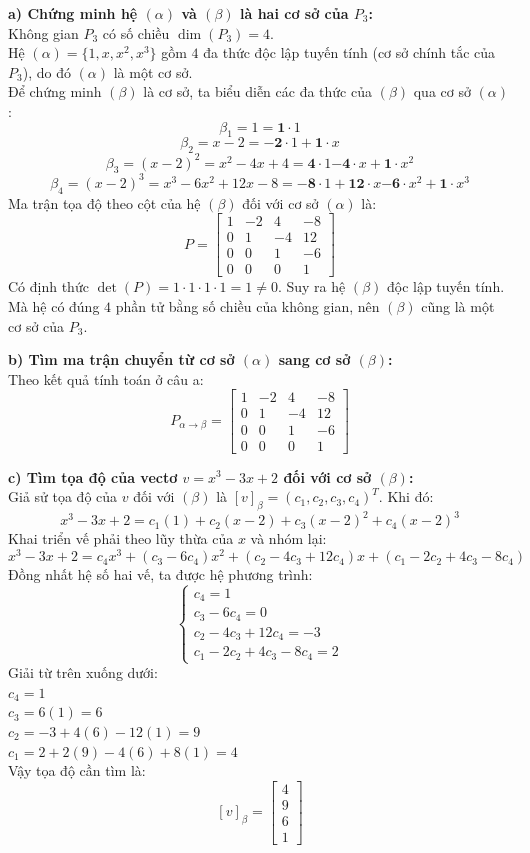 \documentclass[12pt,a4paper]{article}
\begin{document}
\textbf{a) Chứng minh hệ $(\alpha)$ và $(\beta)$ là hai cơ sở của $P_3$:}\\
Không gian $P_3$ có số chiều $\dim(P_3) = 4$.\\
Hệ $(\alpha) = \{1, x, x^2, x^3\}$ gồm $4$ đa thức độc lập tuyến tính (cơ sở chính tắc của $P_3$), do đó $(\alpha)$ là một cơ sở.\\
Để chứng minh $(\beta)$ là cơ sở, ta biểu diễn các đa thức của $(\beta)$ qua cơ sở $(\alpha)$:
$$\beta_1 = 1 = \mathbf{1}\cdot 1$$
$$\beta_2 = x - 2 = \mathbf{-2}\cdot 1 + \mathbf{1}\cdot x$$
$$\beta_3 = (x - 2)^2 = x^2 - 4x + 4 = \mathbf{4}\cdot 1 \mathbf{- 4}\cdot x + \mathbf{1}\cdot x^2$$
$$\beta_4 = (x - 2)^3 = x^3 - 6x^2 + 12x - 8 = \mathbf{-8}\cdot 1 + \mathbf{12}\cdot x \mathbf{- 6}\cdot x^2 + \mathbf{1}\cdot x^3$$
Ma trận tọa độ theo cột của hệ $(\beta)$ đối với cơ sở $(\alpha)$ là:
$$P = \begin{bmatrix} 1 & -2 & 4 & -8 \\ 0 & 1 & -4 & 12 \\ 0 & 0 & 1 & -6 \\ 0 & 0 & 0 & 1 \end{bmatrix}$$
Có định thức $\det(P) = 1 \cdot 1 \cdot 1 \cdot 1 = 1 \neq 0$. Suy ra hệ $(\beta)$ độc lập tuyến tính. Mà hệ có đúng $4$ phần tử bằng số chiều của không gian, nên $(\beta)$ cũng là một cơ sở của $P_3$.

\textbf{b) Tìm ma trận chuyển từ cơ sở $(\alpha)$ sang cơ sở $(\beta)$:}\\
Theo kết quả tính toán ở câu a:
$$P_{\alpha \to \beta} = \begin{bmatrix} 1 & -2 & 4 & -8 \\ 0 & 1 & -4 & 12 \\ 0 & 0 & 1 & -6 \\ 0 & 0 & 0 & 1 \end{bmatrix}$$

\textbf{c) Tìm tọa độ của vectơ $v = x^3 - 3x + 2$ đối với cơ sở $(\beta)$:}\\
Giả sử tọa độ của $v$ đối với $(\beta)$ là $[v]_{\beta} = (c_1, c_2, c_3, c_4)^T$. Khi đó:
$$x^3 - 3x + 2 = c_1(1) + c_2(x-2) + c_3(x-2)^2 + c_4(x-2)^3$$
Khai triển vế phải theo lũy thừa của $x$ và nhóm lại:
$$x^3 - 3x + 2 = c_4 x^3 + (c_3 - 6c_4)x^2 + (c_2 - 4c_3 + 12c_4)x + (c_1 - 2c_2 + 4c_3 - 8c_4)$$
Đồng nhất hệ số hai vế, ta được hệ phương trình:
$$\begin{cases}
c_4 = 1 \\
c_3 - 6c_4 = 0 \\
c_2 - 4c_3 + 12c_4 = -3 \\
c_1 - 2c_2 + 4c_3 - 8c_4 = 2
\end{cases}$$
Giải từ trên xuống dưới:\\
$c_4 = 1$\\
$c_3 = 6(1) = 6$\\
$c_2 = -3 + 4(6) - 12(1) = 9$\\
$c_1 = 2 + 2(9) - 4(6) + 8(1) = 4$\\
Vậy tọa độ cần tìm là:
$$[v]_{\beta} = \begin{bmatrix} 4 \\ 9 \\ 6 \\ 1 \end{bmatrix}$$
\end{document}
